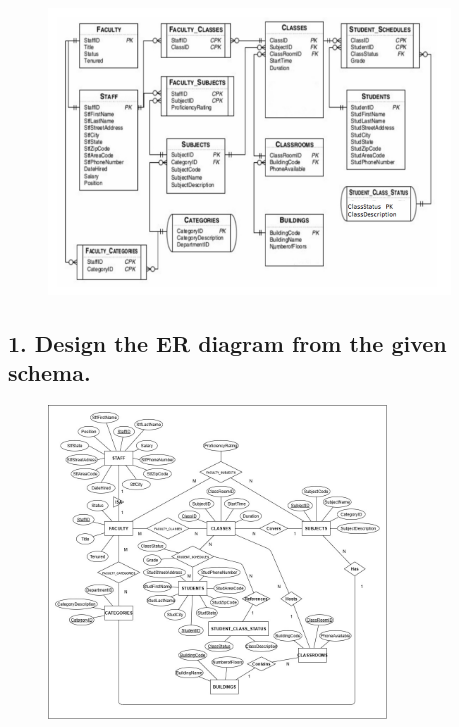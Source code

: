 \documentclass{article}
\begin{document}
\section*{}
\begin{figure}[H]
    \centering
    \includegraphics[width=0.95\textwidth]{cycle1/1.png}
    \label{fig:schema}
\end{figure}

\subsection*{1.  Design the ER diagram from the given schema.}
\begin{figure}[H]
    \centering
    \includegraphics[width=0.8\textwidth]{cycle1/ER.jpeg}
    \label{fig:schema}
\end{figure}
\end{document}

